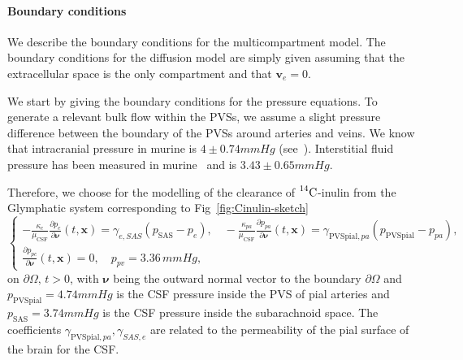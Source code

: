 \documentclass[10pt,letterpaper]{article}
\newcommand{\ie}{\emph{i.e.}\;}
\newcommand{\1}{^{(1)}}
\newcommand{\2}{^{(2)}}
\newcommand{\Cinulin}{$\prescript{14}{}{\text{C}}$-inulin }
\begin{document}
\paragraph{Boundary conditions}
We describe the boundary conditions for the multicompartment model. The boundary conditions for the diffusion model are simply given assuming that the extracellular space is the only compartment and that $\mathbf{v}_e = 0$.

We start by giving the boundary conditions for the pressure equations. 
To generate a relevant bulk flow within the PVSs, we assume a slight pressure difference between the boundary of the PVSs around arteries and veins.
We know that intracranial pressure in murine is $4 \pm 0.74 \si{mmHg}$ (see~\cite{Roy-rat-pressure-2013}). 
Interstitial fluid pressure has been measured in murine~\cite{Wiig-1983-interstitial} and is $3.43 \pm 0.65  \si{mmHg}$.


Therefore, we choose for the modelling of the clearance of \Cinulin from the Glymphatic system corresponding to Fig~\ref{fig:Cinulin-sketch}
\begin{equation}
\begin{cases}
    - \frac{\kappa_e}{\mu_\text{CSF}}\frac{\partial p_e}{\partial \pmb{\nu}}(t,\mathbf{x}) = \gamma_{e , SAS}(p_\text{SAS}-p_{e}),\quad -\frac{\kappa_{pa}}{\mu_\text{CSF}}\frac{\partial p_{pa}}{\partial \pmb{ \nu}}(t,\mathbf x)  = \gamma_{\text{PVSpial},pa}(p_{\text{PVSpial}}-p_{pa}), \\
    \frac{\partial p_{pc}}{\partial \pmb{\nu}}(t,\mathbf x) = 0, \quad p_{pv} = 3.36\, \si{mmHg},  %
\end{cases}
\label{eq:BC-4compsPVS}
\end{equation}
$\text{on } \partial \Omega,\, t>0$, with $\pmb{\nu}$ being the outward normal vector to the boundary $\partial \Omega$ and $p_\text{PVSpial} = 4.74\si{mmHg} $ is the CSF pressure inside the PVS of pial arteries and $p_\text{SAS} = 3.74 \si{mmHg} $ is the CSF pressure inside the subarachnoid space. The coefficients $\gamma_{\text{PVSpial},pa}, \gamma_{SAS , e}$ are related to the permeability of the pial surface of the brain for the CSF.
\end{document}
